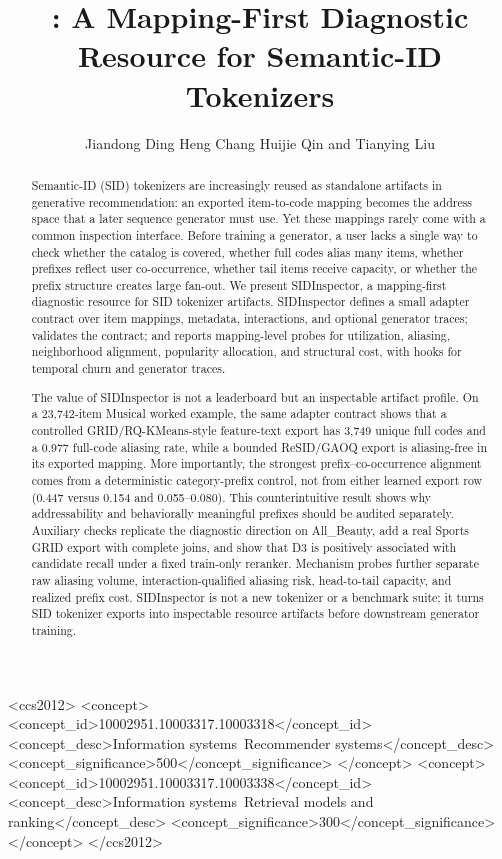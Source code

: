 \documentclass[sigconf,natbib=true]{acmart}
\title{\tool: A Mapping-First Diagnostic Resource for Semantic-ID Tokenizers}
\author{Jiandong Ding\emailcomma{} Heng Chang\emailcomma{} Huijie Qin\emailcomma{} and Tianying Liu}
\affiliation{%
  \institution{Huawei Technologies}
  \city{Shanghai}
  \country{China}
}
\newcommand{\tool}{SIDInspector\xspace}
\newcommand{\sid}{SID\xspace}
\begin{document}
\begin{CCSXML}
<ccs2012>
 <concept>
  <concept_id>10002951.10003317.10003318</concept_id>
  <concept_desc>Information systems~Recommender systems</concept_desc>
  <concept_significance>500</concept_significance>
 </concept>
 <concept>
  <concept_id>10002951.10003317.10003338</concept_id>
  <concept_desc>Information systems~Retrieval models and ranking</concept_desc>
  <concept_significance>300</concept_significance>
 </concept>
</ccs2012>
\end{CCSXML}


\begin{abstract}
Semantic-ID (\sid) tokenizers are increasingly reused as standalone artifacts
in generative recommendation: an exported item-to-code mapping becomes the
address space that a later sequence generator must use. Yet these mappings
rarely come with a common inspection interface. Before training a generator, a
user lacks a single way to check whether the catalog is covered, whether full
codes alias many items, whether prefixes reflect user
co-occurrence, whether tail items receive capacity, or whether the prefix
structure creates large fan-out. We present \tool, a mapping-first diagnostic
resource for \sid tokenizer artifacts. \tool defines a small adapter contract
over item mappings, metadata, interactions, and optional generator traces;
validates the contract; and reports mapping-level probes for utilization,
aliasing, neighborhood alignment, popularity allocation, and structural cost,
with hooks for temporal churn and generator traces.

The value of \tool is not a leaderboard but an inspectable artifact profile.
On a 23,742-item Musical worked example, the same adapter contract
shows that a controlled GRID/RQ-KMeans-style feature-text export has 3,749
unique full codes and a 0.977 full-code aliasing rate, while a bounded
ReSID/GAOQ export is aliasing-free in its exported mapping. More importantly,
the strongest prefix--co-occurrence alignment comes
from a deterministic category-prefix control, not from either learned export
row (0.447 versus 0.154 and 0.055--0.080). This counterintuitive result
shows why addressability and behaviorally meaningful prefixes should be audited
separately. Auxiliary checks replicate the diagnostic direction on All\_Beauty,
add a real Sports GRID export with complete joins, and show that D3 is
positively associated with candidate recall under a fixed train-only reranker.
Mechanism probes further separate raw aliasing volume, interaction-qualified
aliasing risk, head-to-tail capacity, and realized prefix cost. \tool is not a
new tokenizer or a benchmark suite; it turns \sid tokenizer exports into
inspectable resource artifacts before downstream generator training.
\end{abstract}
\end{document}
